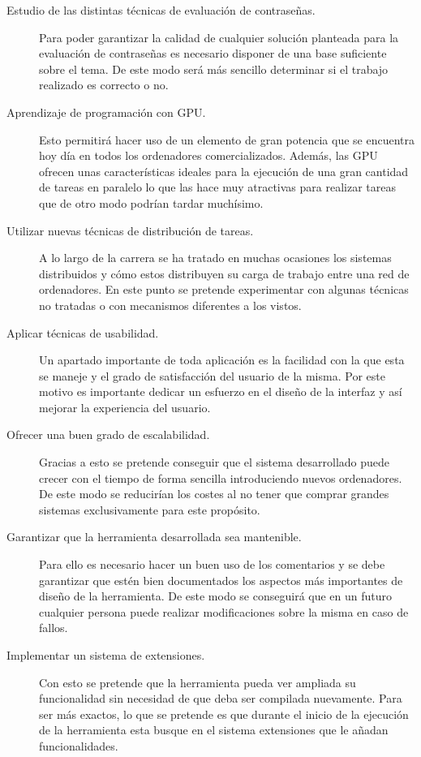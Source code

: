 \begin{description}

	\item[Estudio de las distintas técnicas de evaluación de contraseñas.] Para poder garantizar la calidad de cualquier solución planteada para la evaluación de contraseñas es necesario disponer de una base suficiente sobre el tema. De este modo será más sencillo determinar si el trabajo realizado es correcto o no.
	
	\item[Aprendizaje de programación con GPU.] Esto permitirá hacer uso de un elemento de gran potencia que se encuentra hoy día en todos los ordenadores comercializados. Además, las GPU ofrecen unas características ideales para la ejecución de una gran cantidad de tareas en paralelo lo que las hace muy atractivas para realizar tareas que de otro modo podrían tardar muchísimo.
	
	\item[Utilizar nuevas técnicas de distribución de tareas.] A lo largo de la carrera se ha tratado en muchas ocasiones los sistemas distribuidos y cómo estos distribuyen su carga de trabajo entre una red de ordenadores. En este punto se pretende experimentar con algunas técnicas no tratadas o con mecanismos diferentes a los vistos.
	
	\item[Aplicar técnicas de usabilidad.] Un apartado importante de toda aplicación es la facilidad con la que esta se maneje y el grado de satisfacción del usuario de la misma. Por este motivo es importante dedicar un esfuerzo en el diseño de la interfaz y así mejorar la experiencia del usuario.
	
	\item[Ofrecer una buen grado de escalabilidad.] Gracias a esto se pretende conseguir que el sistema desarrollado puede crecer con el tiempo de forma sencilla introduciendo nuevos ordenadores. De este modo se reducirían los costes al no tener que comprar grandes sistemas exclusivamente para este propósito.
	
	\item[Garantizar que la herramienta desarrollada sea mantenible.] Para ello es necesario hacer un buen uso de los comentarios y se debe garantizar que estén bien documentados los aspectos más importantes de diseño de la herramienta. De este modo se conseguirá que en un futuro cualquier persona puede realizar modificaciones sobre la misma en caso de fallos.
	
	\item[Implementar un sistema de extensiones.] Con esto se pretende que la herramienta pueda ver ampliada su funcionalidad sin necesidad de que deba ser compilada nuevamente. Para ser más exactos, lo que se pretende es que durante el inicio de la ejecución de la herramienta esta busque en el sistema extensiones que le añadan funcionalidades.
	

\end{description}
